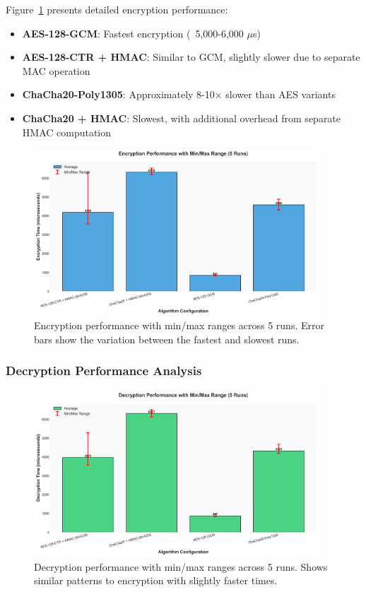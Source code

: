 \documentclass[12pt,a4paper]{article}
\begin{document}
Figure~\ref{fig:enc_perf} presents detailed encryption performance:
\begin{itemize}
    \item \textbf{AES-128-GCM}: Fastest encryption (~5,000-6,000 $\mu$s)
    \item \textbf{AES-128-CTR + HMAC}: Similar to GCM, slightly slower due to separate MAC operation
    \item \textbf{ChaCha20-Poly1305}: Approximately 8-10× slower than AES variants
    \item \textbf{ChaCha20 + HMAC}: Slowest, with additional overhead from separate HMAC computation
\end{itemize}

\begin{figure}[H]
\centering
\includegraphics[width=0.95\textwidth]{encryption_performance.png}
\caption{Encryption performance with min/max ranges across 5 runs. Error bars show the variation between the fastest and slowest runs.}
\label{fig:enc_perf}
\end{figure}

\subsubsection{Decryption Performance Analysis}

\begin{figure}[H]
\centering
\includegraphics[width=0.95\textwidth]{decryption_performance.png}
\caption{Decryption performance with min/max ranges across 5 runs. Shows similar patterns to encryption with slightly faster times.}
\label{fig:dec_perf}
\end{figure}
\end{document}
